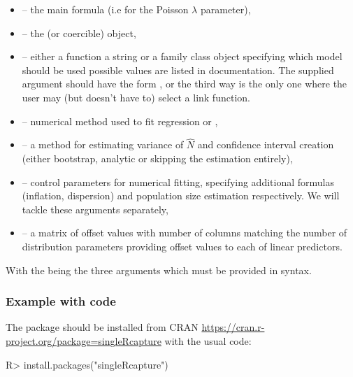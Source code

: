 \documentclass[
]{jss}
\newcommand{\1}{\mathcal{I}} \newcommand{\bx}{\boldsymbol{x}}
\begin{document}
\begin{itemize}
    \item {} -- the main formula (i.e for the Poisson $\lambda$ parameter),
    \item {} -- the  (or  coercible) object,
    \item {} -- either a function a string or a family class object specifying which model should be used possible values are listed in documentation. The supplied argument should have the form ,  or  the third way is the only one where the user may (but doesn't have to) select a link function.
    \item {} -- numerical method used to fit regression  or ,
    \item {} -- a method for estimating variance of $\hat{N}$ and confidence interval creation (either bootstrap, analytic or skipping the estimation entirely),
    \item {} -- control parameters for numerical fitting, specifying additional formulas (inflation, dispersion) and population size estimation respectively. We will tackle these arguments separately,
    \item {} -- a matrix of offset values with number of columns matching the number of distribution parameters providing offset values to each of linear predictors.
\end{itemize}

With the  being the three arguments which
must be provided in  syntax.

\subsubsection[Example with R code]{Example with 
code}\label{r-code}

The package should be installed from CRAN
\url{https://cran.r-project.org/package=singleRcapture} with the usual
code:

\begin{CodeChunk}
\begin{CodeInput}
R> install.packages("singleRcapture")
\end{CodeInput}
\end{CodeChunk}
\end{document}
